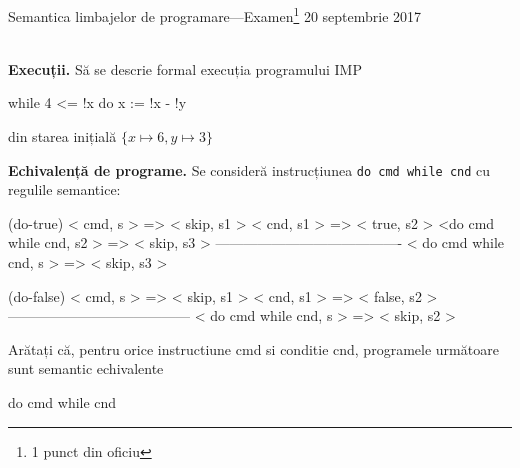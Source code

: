 \documentclass[addpoints,12pt,a4paper,answers]{exam}
\begin{document}
\begin{center}


Semantica limbajelor de programare---Examen\footnote{1 punct din oficiu} \hfill  20 septembrie 2017 \\ \ \\

\end{center}


\begin{questions}
\question[3] \textbf{Execuții. }
Să se descrie formal execuția programului IMP
\begin{asciiml}
while 4 <= !x do x := !x - !y
\end{asciiml}

\vspace{-1ex}din starea inițială \(\{x \mapsto 6, y \mapsto 3\}\)

\question[1] \textbf{Echivalență de programe. }
Se consideră instrucțiunea \lstinline$do cmd while cnd$
cu regulile semantice:

\begin{asciiml}
(do-true)
   < cmd, s > => < skip, s1 >
   < cnd, s1 > => < true, s2 >
   <do cmd while cnd, s2 > => < skip, s3 >
   ----------------------------------------
   < do cmd while cnd, s > => < skip, s3 >

(do-false)
   < cmd, s > => < skip, s1 >
   < cnd, s1 > => < false, s2 >
   ---------------------------------------
   < do cmd while cnd, s > => < skip, s2 >
\end{asciiml}

Arătați că, pentru orice instructiune cmd si conditie cnd,
programele următoare sunt semantic echivalente
\begin{asciiml}
do cmd while cnd


\end{asciiml}
\end{questions}
\end{document}
